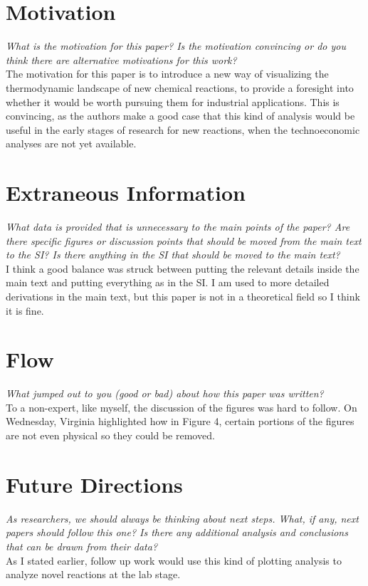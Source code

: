 \documentclass[12pt]{article}
\begin{document}
\section*{Motivation}
\textit{What is the motivation for this paper? Is the motivation convincing or do you think there are alternative motivations for this work?}\\[4pt]
The motivation for this paper is to introduce a new way of visualizing the thermodynamic landscape of new chemical reactions, to provide a foresight into whether it would be worth pursuing them for industrial applications. This is convincing, as the authors make a good case that this kind of analysis would be useful in the early stages of research for new reactions, when the technoeconomic analyses are not yet available.

\section*{Extraneous Information}
\textit{What data is provided that is unnecessary to the main points of the paper? Are there specific figures or discussion points that should be moved from the main text to the SI? Is there anything in the SI that should be moved to the main text?}\\[4pt]
I think a good balance was struck between putting the relevant details inside the main text and putting everything as in the SI. I am used to more detailed derivations in the main text, but this paper is not in a theoretical field so I think it is fine.
\section*{Flow}
\textit{What jumped out to you (good or bad) about how this paper was written?}\\[4pt]
To a non-expert, like myself, the discussion of the figures was hard to follow. On Wednesday, Virginia highlighted how in Figure 4, certain portions of the figures are not even physical so they could be removed.
\section*{Future Directions}
\textit{As researchers, we should always be thinking about next steps. What, if any, next papers should follow this one? Is there any additional analysis and conclusions that can be drawn from their data?}\\[4pt]
As I stated earlier, follow up work would use this kind of plotting analysis to analyze novel reactions at the lab stage.
\end{document}
